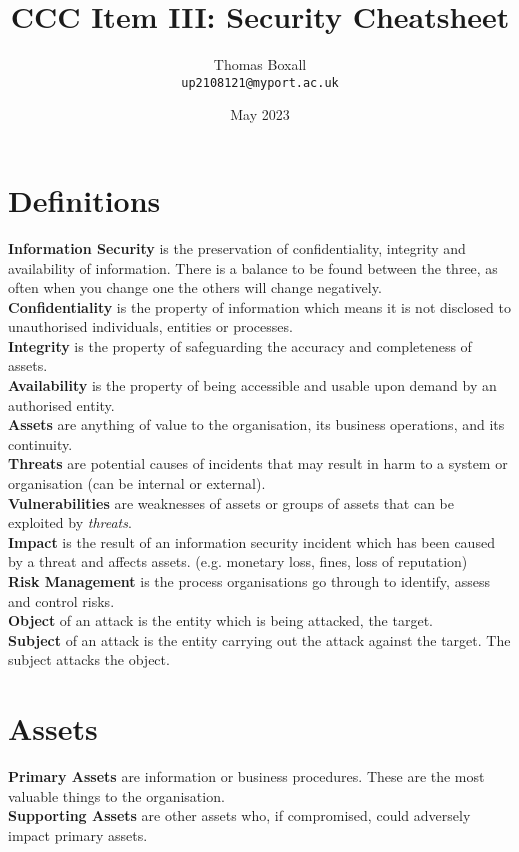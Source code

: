\documentclass[a4paper,11pt]{article}
\title{CCC Item III: Security Cheatsheet}
\author{Thomas Boxall\\ \texttt{up2108121@myport.ac.uk}}
\date{May 2023}
\begin{document}
\maketitle
\thispagestyle{fancy}

\section{Definitions}
\textbf{Information Security} is the preservation of confidentiality, integrity and availability of information. There is a balance to be found between the three, as often when you change one the others will change negatively.\\
\textbf{Confidentiality} is the property of information which means it is not disclosed to unauthorised individuals, entities or processes.\\
\textbf{Integrity} is the property of safeguarding the accuracy and completeness of assets.\\
\textbf{Availability} is the property of being accessible and usable upon demand by an authorised entity.\\
\textbf{Assets} are anything of value to the organisation, its business operations, and its continuity.\\
\textbf{Threats} are potential causes of incidents that may result in harm to a system or organisation (can be internal or external).\\
\textbf{Vulnerabilities} are weaknesses of assets or groups of assets that can be exploited by \textit{threats}.\\
\textbf{Impact} is the result of an information security incident which has been caused by a threat and affects assets. (e.g. monetary loss, fines, loss of reputation)\\
\textbf{Risk Management} is the process organisations go through to identify, assess and control risks. \\
\textbf{Object} of an attack is the entity which is being attacked, the target.\\
\textbf{Subject} of an attack is the entity carrying out the attack against the target. The subject attacks the object. 

\section{Assets}
\textbf{Primary Assets} are information or business procedures. These are the most valuable things to the organisation.\\
\textbf{Supporting Assets} are other assets who, if compromised, could adversely impact primary assets.
\end{document}
